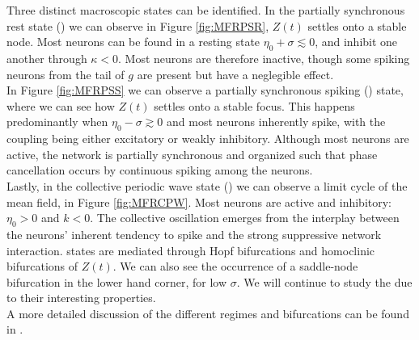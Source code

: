 Three distinct macroscopic states can be identified. In the partially synchronous rest state (\PSR) we can observe in Figure \ref{fig:MFRPSR}, $Z(t)$ settles onto a stable node. Most neurons can be found in a resting state $\eta_0 + \sigma \lesssim 0$, and inhibit one another through $\kappa < 0$. Most neurons are therefore inactive, though some spiking neurons from the tail of $g$ are present but have a neglegible effect. \\

In Figure \ref{fig:MFRPSS} we can observe a partially synchronous spiking (\PSS) state, where we can see how $Z(t)$ settles onto a stable focus. This happens predominantly when $\eta_0 - \sigma \gtrsim 0$ and most neurons inherently spike, with the coupling being either excitatory or weakly inhibitory. Although most neurons are active, the network is partially synchronous and organized such that phase cancellation occurs by continuous spiking among the neurons.\\

Lastly, in the collective periodic wave state (\CPW) we can observe a limit cycle of the mean field, in Figure \ref{fig:MFRCPW}. Most neurons are active and inhibitory: $\eta_0 > 0$ and $k < 0$. The collective oscillation emerges from the interplay between the neurons’ inherent tendency to spike and the strong suppressive network interaction. \CPW states are mediated through Hopf bifurcations and homoclinic bifurcations of $Z(t)$. We can also see the occurrence of a saddle-node bifurcation in the lower hand corner, for low $\sigma$. We will continue to study the \CPW due to their interesting properties.\\

A more detailed discussion of the different regimes and bifurcations can be found in \cite{Luke2013}.


